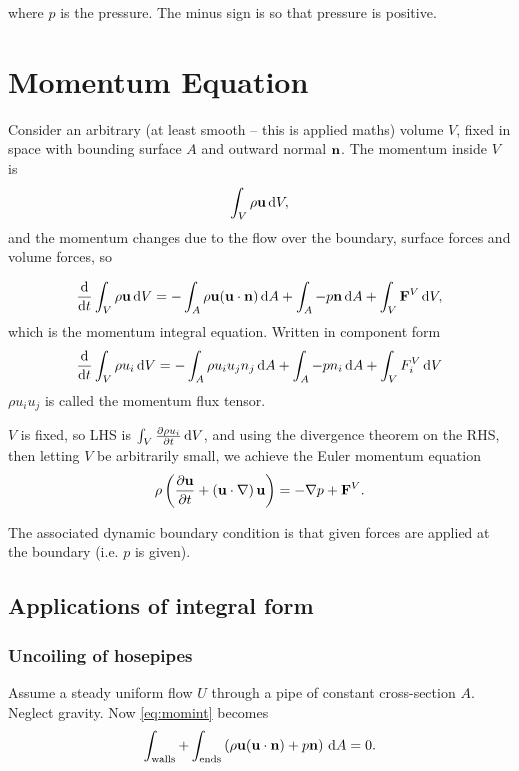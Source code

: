 \documentclass{notes}
\newcommand{\grad}{\nabla}
\newcommand{\dgrad}[2]{\left(#1\cdot\nabla\right)#2}
\begin{document}
where $p$ is the pressure.  The minus sign is so that pressure is
positive.

\section{Momentum Equation}

Consider an arbitrary (at least smooth -- this is applied maths)
volume $V$, fixed in space with bounding surface $A$ and outward
normal $\mathbf{n}$.  The momentum inside $V$ is
\[
\int_V \rho \mathbf{u} \,\mathrm{d} V,
\]
and the momentum changes due to the flow over the boundary, surface
forces and volume forces, so

\begin{equation}\label{eq:momint}
\frac{\mathrm{d}}{\mathrm{d} t} \int_V \rho \mathbf{u} \,\mathrm{d} V = -\int_A \rho \mathbf{u} (\mathbf{u}\cdot\mathbf{n})
\,\mathrm{d} A + \int_A -p \mathbf{n} \,\mathrm{d} A + \int_V \mathbf{F}^V \,\mathrm{d} V,
\end{equation}
which is the momentum integral equation.  Written in component form
\[
\frac{\mathrm{d}}{\mathrm{d} t} \int_V \rho u_i \,\mathrm{d} V = -\int_A \rho u_iu_jn_j
\,\mathrm{d} A + \int_A -p n_i \,\mathrm{d} A + \int_V F_i^V \,\mathrm{d} V
\]
$\rho u_iu_j$ is called the momentum flux tensor.

$V$ is fixed, so LHS is $\int_V \frac{\partial \rho u_i}{\partial t} \,\mathrm{d} V$, and using
the divergence theorem on the RHS, then letting $V$ be arbitrarily
small, we achieve the Euler momentum equation
\begin{equation}\label{eq:eumom}
\rho \left( \pd{\vu}{t} + \dgrad{\vu}{\vu} \right) =-\grad p + \vF^V.
\end{equation}

The associated dynamic boundary condition is that given forces are
applied at the boundary (i.e. $p$ is given).

\subsection{Applications of integral form}

\subsubsection*{Uncoiling of hosepipes}

\vspace{1.5in}

Assume a steady uniform flow $U$ through a pipe of constant
cross-section $A$.   Neglect gravity.  Now \eqref{eq:momint} becomes
\[
\int_{\text{walls}} + \int_{\text{ends}} \left( \rho \mathbf{u} (\mathbf{u} \cdot \mathbf{n})
  + p \mathbf{n} \right)\, \mathrm{d} A = 0.
\]
\end{document}
